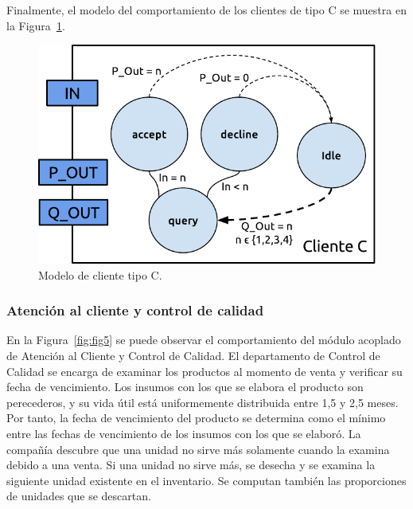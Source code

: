 \documentclass[10pt]{article}
\begin{document}
Finalmente, el modelo del comportamiento de los clientes de tipo C se muestra en la Figura~\ref{fig:fig4}.

\begin{figure}
\centering
\includegraphics[scale=1]{img/figura4}
\caption{Modelo de cliente tipo C.}
\label{fig:fig4}
\end{figure}

\subsubsection{Atención al cliente y control de calidad}
En la Figura~\ref{fig:fig5} se puede observar el comportamiento del módulo acoplado de Atención al Cliente y Control de Calidad. El departamento de Control de Calidad se encarga de examinar los productos al momento de venta y verificar su fecha de vencimiento. Los insumos con los que se elabora el producto son perecederos, y su vida útil está uniformemente distribuida entre 1,5 y 2,5 meses. Por tanto, la fecha de vencimiento del producto se determina como el mínimo entre las fechas de vencimiento de los insumos con los que se elaboró. La compañía descubre que una unidad no sirve más solamente cuando la examina debido a una venta. Si una unidad no sirve más, se desecha  y se examina la siguiente unidad existente en el inventario. Se computan también las proporciones de unidades que se descartan.
\end{document}
